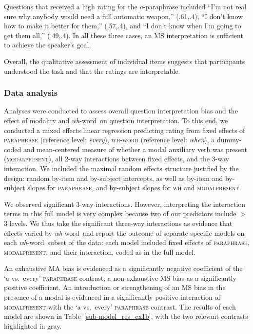 \documentclass[12pt,letterpaper,table,svgnames,dvipsnames]{article}
\newcommand{\tableref}[1]{Table~\ref{#1}}
\newcommand{\whw}{\emph{wh}-word~}
\begin{document}
Questions that received a high rating for the \emph{a}-paraphrase included
``I’m not real sure why anybody would need a full automatic weapon,'' (.61,.4), 
``I don’t know how to make it better for them,'' (.57,.4), and 
``I don’t know when I’m going to get them all,'' (.49,.4). In all these three cases, an MS interpretation is sufficient to achieve the speaker's goal.

Overall, the qualitative assessment of individual items suggests that participants understood the task and that the ratings are interpretable.




\subsubsection{Data analysis}
Analyses were conducted to assess overall question interpretation bias and the effect of modality and \whw on question interpretation. To this end, we conducted a mixed effects linear regression predicting rating from fixed effects of \textsc{paraphrase} (reference level: \emph{every}), \textsc{wh-word} (reference level: \emph{when}), a dummy-coded and mean-centered measure of whether a modal auxiliary verb was present (\textsc{modalpresent}), all 2-way interactions between fixed effects, and the 3-way interaction. We included the maximal random effects structure justified by the design: random by-item and by-subject intercepts, as well as by-item and by-subject slopes for \textsc{paraphrase}, and by-subject slopes for \textsc{wh} and \textsc{modalpresent}. 

We observed significant 3-way interactions. %
However, interpreting the interaction terms in this full model is very complex because two of our predictors include $>$ 3 levels. We thus take the significant three-way interactions as evidence that effects varied by \whw and  report the outcome of separate specific models on each \whw subset of the data: each model included fixed effects of \textsc{paraphrase}, \textsc{modalpresent}, and their interaction, coded as in the full model. 

An exhaustive MA bias is evidenced as a significantly negative coefficient of the `a vs.~every' \textsc{paraphrase} contrast; a non-exhaustive MS bias as a significantly positive coefficient. An introduction or strengthening of an MS bias in the presence of a modal is evidenced in a significantly positive interaction of \textsc{modalpresent} with the `a vs.~every' \textsc{paraphrase} contrast. The results of each model are shown in \tableref{sub-model_res_ex1b}, with the two relevant contrasts highlighted in gray.
\end{document}
